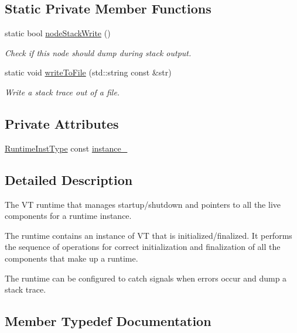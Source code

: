 \subsection*{Static Private Member Functions}
\begin{DoxyCompactItemize}
\item 
static bool \hyperlink{structvt_1_1runtime_1_1_runtime_aa9759e29e6159ac0d84c60dd609cbcad}{node\+Stack\+Write} ()
\begin{DoxyCompactList}\small\item\em Check if this node should dump during stack output. \end{DoxyCompactList}\item 
static void \hyperlink{structvt_1_1runtime_1_1_runtime_a2ebba5dbe6d948d441311778b94a9f3d}{write\+To\+File} (std\+::string const \&str)
\begin{DoxyCompactList}\small\item\em Write a stack trace out of a file. \end{DoxyCompactList}\end{DoxyCompactItemize}
\subsection*{Private Attributes}
\begin{DoxyCompactItemize}
\item 
\hyperlink{namespacevt_1_1runtime_afca910c1b38b3975f7c1da8001a77d58}{Runtime\+Inst\+Type} const \hyperlink{structvt_1_1runtime_1_1_runtime_a1992e655c80324668af6b973b2cbd62b}{instance\+\_\+}
\end{DoxyCompactItemize}


\subsection{Detailed Description}
The VT runtime that manages startup/shutdown and pointers to all the live components for a runtime instance. 

The runtime contains an instance of VT that is initialized/finalized. It performs the sequence of operations for correct initialization and finalization of all the components that make up a runtime.

The runtime can be configured to catch signals when errors occur and dump a stack trace. 

\subsection{Member Typedef Documentation}
\mbox{\label{structvt_1_1runtime_1_1_runtime_a0893bf0a8c03b898e8ab66b52cec80ad}} 
